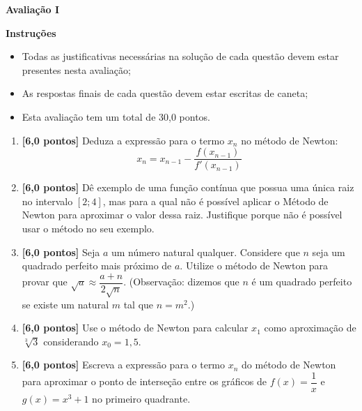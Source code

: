 \documentclass[12pt,a4paper]{article}
\begin{document}
\begin{center}
 \textbf{Avaliação I}
\end{center}

\textbf{Instruções}
\begin{itemize}
 \item Todas as justificativas necessárias na solução de cada questão devem 
 estar presentes nesta avaliação;
 \item As respostas finais de cada questão devem estar escritas de caneta;
 \item Esta avaliação tem um total de 30,0 pontos.
\end{itemize}

\begin{enumerate}
  \item \textbf{[6,0 pontos]} Deduza a expressão para o termo $x_n$ no método de Newton:
  $$x_n = x_{n-1} - \frac{f(x_{n-1})}{f'(x_{n-1})}$$

  \item \textbf{[6,0 pontos]} Dê exemplo de uma função contínua que possua uma única raiz
  no intervalo $[2; 4]$, mas para a qual não é possível aplicar o Método de Newton para
  aproximar o valor dessa raiz. Justifique porque não é possível usar o método no seu exemplo.

  \item \textbf{[6,0 pontos]} Seja $a$ um número natural qualquer. Considere que $n$ seja um
  quadrado perfeito mais próximo de $a$. Utilize o método de Newton para provar que 
  $\sqrt{a}\approx \dfrac{a+n}{2\sqrt{n}}$. (Observação: dizemos que $n$ é um quadrado perfeito 
  se existe um natural $m$ tal que $n = m^2$.)
 
  \item \textbf{[6,0 pontos]} Use o método de Newton para calcular $x_1$ como aproximação 
  de $\sqrt[3]{3}$ considerando $x_0 = 1,5$.

  \item \textbf{[6,0 pontos]} Escreva a expressão para o termo $x_n$ do método de Newton
  para aproximar o ponto de interseção entre os gráficos de $f(x) = \dfrac{1}{x}$ e $g(x) = x^3 + 1$
  no primeiro quadrante.

\end{enumerate}
\end{document}
